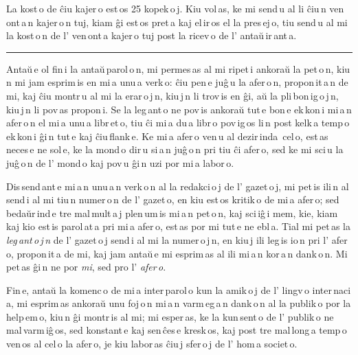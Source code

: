 La kost\,o de ĉiu kajer\,o est\,os 25 kopek\,o\,j. Kiu vol\,as, ke mi send\,u al li ĉiu\,n ven\,ont\,a\,n kajer\,o\,n tuj, kiam ĝi est\,os pret\,a kaj el\,ir\,os el la pres\,ej\,o, tiu send\,u al mi la kost\,o\,n de l' ven\,ont\,a kajer\,o tuj post la ricev\,o de l' antaŭ\,ir\,ant\,a.

\begin{center}
\rule{0.2\textwidth}{0.4pt}
\end{center}

Antaŭ\,e ol fin\,i la antaŭ\,parol\,o\,n, mi permes\,as al mi ripet\,i ankoraŭ la pet\,o\,n, kiu\,n mi jam esprim\,is en mi\,a unu\,a verk\,o: ĉiu pen\,e juĝ\,u la afer\,o\,n, propon\,it\,a\,n de mi, kaj ĉiu montr\,u al mi la erar\,o\,j\,n, kiu\,j\,n li trov\,is en ĝi, aŭ la pli\,bon\,ig\,o\,j\,n, kiu\,j\,n li pov\,as propon\,i. Se la leg\,ant\,o ne pov\,is ankoraŭ tut\,e bon\,e ek\,kon\,i mi\,a\,n afer\,o\,n el mi\,a unu\,a libr\,et\,o, tiu ĉi mi\,a du\,a libr\,o pov\,ig\,os li\,n post kelk\,a temp\,o ek\,kon\,i ĝi\,n tut\,e kaj ĉiu\,flank\,e. Ke mi\,a afer\,o ven\,u al dezir\,inda\, cel\,o, est\,as neces\,e ne sol\,e, ke la mond\,o dir\,u si\,a\,n juĝ\,o\,n pri tiu ĉi afer\,o, sed ke mi sci\,u la juĝ\,o\,n de l' mond\,o kaj pov\,u ĝi\,n uzi por mi\,a labor\,o.

Dis\,send\,ant\,e mi\,a\,n unu\,a\,n verk\,o\,n al la redakci\,o\,j de l' gazet\,o\,j, mi pet\,is ili\,n al\,send\,i al mi tiu\,n numer\,o\,n de l' gazet\,o, en kiu est\,os kritik\,o de mi\,a afer\,o; sed bedaŭr\,ind\,e tre mal\,mult\,a\,j plen\,um\,is mi\,a\,n pet\,o\,n, kaj sci\,iĝ\,i mem, kie, kiam kaj kio est\,is parol\,at\,a pri mi\,a afer\,o, est\,as por mi tut\,e ne ebl\,a. Tial mi pet\,as la \emph{leg\,ant\,o\,j\,n} de l' gazet\,o\,j send\,i al mi la numer\,o\,j\,n, en kiu\,j ili leg\,is io\,n pri l' afer\,o, propon\,it\,a de mi, kaj jam antaŭ\,e mi esprim\,as al ili mi\,a\,n kor\,a\,n dank\,o\,n. Mi pet\,as ĝi\,n ne por \emph{mi}, sed pro l' \emph{afer\,o}.

Fin\,e, antaŭ la komenc\,o de mi\,a inter\,parol\,o kun la amik\,o\,j de l' lingv\,o inter\,naci\,a, mi esprim\,as ankoraŭ unu foj\,o\,n mi\,a\,n varm\,eg\,a\,n dank\,o\,n al la publik\,o por la help\,em\,o, kiu\,n ĝi montr\,is al mi; mi esper\,as, ke la kun\,sent\,o de l' publik\,o ne mal\,varm\,iĝ\,os, sed konstant\,e kaj sen\,ĉes\,e kresk\,os, kaj post tre mal\,long\,a temp\,o ven\,os al cel\,o la afer\,o, je kiu labor\,as ĉiu\,j sfer\,o\,j de l' hom\,a societ\,o. 

\begin{center}
\\[12pt]
\end{center}
